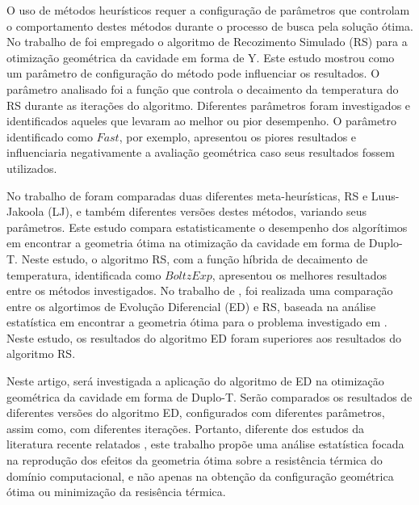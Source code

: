 \documentclass[12pt,A4,A4pt]{article}
\begin{document}
O uso de métodos heurísticos requer a configuração de parâmetros que controlam o comportamento destes métodos durante o processo de busca pela solução ótima. No trabalho de  foi empregado o algoritmo de Recozimento Simulado (RS) para a otimização geométrica da cavidade em forma de Y. Este estudo mostrou como um parâmetro de configuração do método pode influenciar os resultados. O parâmetro analisado foi a função que controla o decaimento da temperatura do RS durante as iterações do algoritmo. Diferentes parâmetros foram investigados e identificados aqueles que levaram ao melhor ou pior desempenho. O parâmetro identificado como $Fast$, por exemplo, apresentou os piores resultados e influenciaria negativamente a avaliação geométrica caso seus resultados fossem utilizados. 

No trabalho de \cite{Gonzales2017} foram comparadas duas diferentes meta-heurísticas, RS e Luus-Jakoola (LJ), e também diferentes versões destes métodos, variando seus parâmetros. Este estudo compara estatisticamente o desempenho dos algorítimos em encontrar a geometria ótima na otimização da cavidade em forma de Duplo-T. Neste estudo, o algoritmo RS, com a função híbrida de decaimento de temperatura, identificada como $BoltzExp$, apresentou os melhores resultados entre os métodos investigados. No trabalho de , foi realizada uma comparação entre os algortimos de Evolução Diferencial (ED) e RS, baseada na análise estatística em encontrar a geometria ótima para o problema investigado em \cite{Gonzales2017}. Neste estudo, os resultados do algoritmo ED foram superiores aos resultados do algoritmo RS.

Neste artigo, será investigada a aplicação do algoritmo de ED na otimização geométrica da cavidade em forma de Duplo-T. Serão comparados os resultados de diferentes versões do algoritmo ED, configurados com diferentes parâmetros, assim como, com diferentes iterações. Portanto, diferente dos estudos da literatura recente relatados \cite{Gonzales2017, Gonzales2018}, este trabalho propõe uma análise estatística focada na reprodução dos efeitos da geometria ótima sobre a resistência térmica do domínio computacional, e não apenas na obtenção da configuração geométrica ótima ou minimização da resisência térmica.
\end{document}
